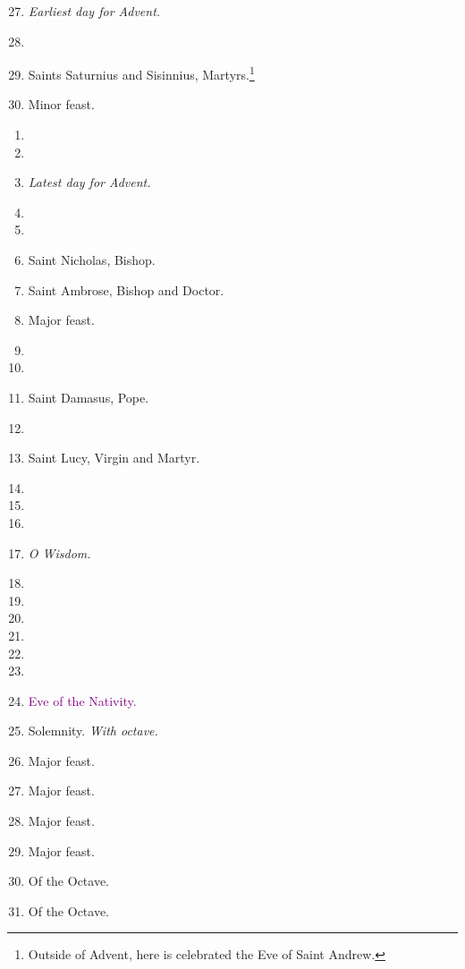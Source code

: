 		\begin{enumerate}
			\setcounter{enumi}{26}
			\item {\textit{\small Earliest day for Advent.}}
			\item %
			\item Saints Saturnius and Sisinnius, Martyrs.\footnote{Outside of Advent, here is celebrated the Eve of Saint Andrew.} 
			\item {} Minor feast.
		\end{enumerate}
		\begin{enumerate}
			\item %
			\item %
			\item \textit{\small Latest day for Advent.} %
			\item  %
			\item %
			\item Saint Nicholas, Bishop. 
			\item Saint Ambrose, Bishop and Doctor. 
			\item {} Major feast.
			\item %
			\item %
			\item Saint Damasus, Pope.  %
			\item  %
			\item Saint Lucy, Virgin and Martyr. 
			\item  %
			\item %
			\item %
			\item {\textit{\small O Wisdom.}} %
			\item  %
			\item  %
			\item  %
			\item %
			\item  %
			\item  %
			\item \textcolor{purple}{Eve of the Nativity.} 
			\item \textbf{} Solemnity. \textit{With octave.}
			\item {} Major feast.
			\item {} Major feast.
			\item {} Major feast.
			\item {} Major feast.
			\item Of the Octave.  %
			\item Of the Octave. 
		\end{enumerate}
